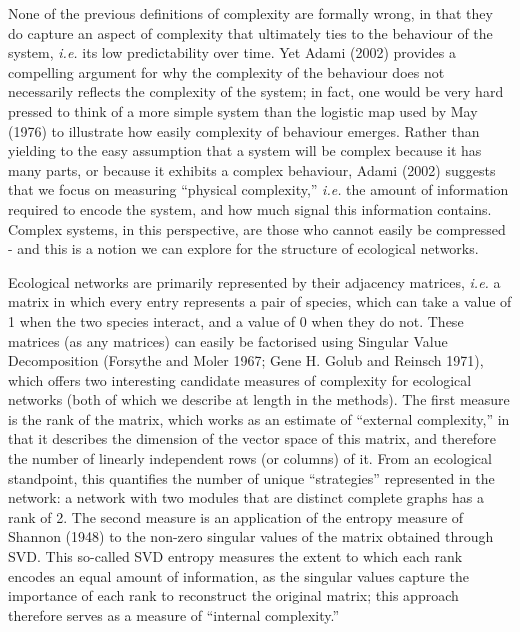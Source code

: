 \documentclass[11pt]{article}
\begin{document}
None of the previous definitions of complexity are formally wrong, in
that they do capture an aspect of complexity that ultimately ties to the
behaviour of the system, \emph{i.e.} its low predictability over time.
Yet Adami (2002) provides a compelling argument for why the complexity
of the behaviour does not necessarily reflects the complexity of the
system; in fact, one would be very hard pressed to think of a more
simple system than the logistic map used by May (1976) to illustrate how
easily complexity of behaviour emerges. Rather than yielding to the easy
assumption that a system will be complex because it has many parts, or
because it exhibits a complex behaviour, Adami (2002) suggests that we
focus on measuring ``physical complexity,'' \emph{i.e.} the amount of
information required to encode the system, and how much signal this
information contains. Complex systems, in this perspective, are those
who cannot easily be compressed - and this is a notion we can explore
for the structure of ecological networks.

Ecological networks are primarily represented by their adjacency
matrices, \emph{i.e.} a matrix in which every entry represents a pair of
species, which can take a value of 1 when the two species interact, and
a value of 0 when they do not. These matrices (as any matrices) can
easily be factorised using Singular Value Decomposition (Forsythe and
Moler 1967; Gene H. Golub and Reinsch 1971), which offers two
interesting candidate measures of complexity for ecological networks
(both of which we describe at length in the methods). The first measure
is the rank of the matrix, which works as an estimate of ``external
complexity,'' in that it describes the dimension of the vector space of
this matrix, and therefore the number of linearly independent rows (or
columns) of it. From an ecological standpoint, this quantifies the
number of unique ``strategies'' represented in the network: a network
with two modules that are distinct complete graphs has a rank of 2. The
second measure is an application of the entropy measure of Shannon
(1948) to the non-zero singular values of the matrix obtained through
SVD. This so-called SVD entropy measures the extent to which each rank
encodes an equal amount of information, as the singular values capture
the importance of each rank to reconstruct the original matrix; this
approach therefore serves as a measure of ``internal complexity.''
\end{document}

